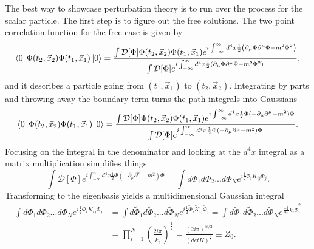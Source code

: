 The best way to showcase perturbation theory is to run over the process for the scalar particle. The first step is to figure out the free solutions. The two point correlation function for the free case is given by
\begin{equation}
\bra{0}\Phi(t_2,\vec{x}_2)\Phi(t_1,\vec{x}_1)\ket{0} = 
\frac{\int \mathcal{D}[\Phi]\Phi(t_2,\vec{x}_2)\Phi(t_1,\vec{x}_1)e^{i\int_{-\infty}^{\infty} d^4x \frac{1}{2}\left(\partial_\mu\Phi\partial^\mu\Phi - m^2 \Phi^2 \right)}}
{\int \mathcal{D}[\Phi]e^{i\int_{-\infty}^{\infty} d^4x \frac{1}{2}\left(\partial_\mu\Phi\partial^\mu\Phi - m^2 \Phi^2 \right)}},
\end{equation}
and it describes a particle going from $(t_1,\vec{x}_1)$ to $(t_2,\vec{x}_2)$. Integrating by parts and throwing away the boundary term turns the path integrals into Gaussians 
\begin{equation}
\bra{0}\Phi(t_2,\vec{x}_2)\Phi(t_1,\vec{x}_1)\ket{0} = 
\frac{\int \mathcal{D}[\Phi]\Phi(t_2,\vec{x}_2)\Phi(t_1,\vec{x}_1)e^{i\int_{-\infty}^{\infty} d^4x \frac{1}{2}\Phi (-\partial_\mu\partial^\mu - m^2)\Phi}}
{\int \mathcal{D}[\Phi]e^{i\int_{-\infty}^{\infty} d^4x \frac{1}{2}\Phi (-\partial_\mu\partial^\mu - m^2)\Phi}}.
\end{equation}
Focusing on the integral in the denominator and looking at the $d^4x$ integral as a matrix multiplication simplifies things 
\begin{equation}
\int \mathcal{D}[\Phi]e^{i\int_{-\infty}^{\infty} d^4x \frac{1}{2}\Phi (-\partial_\mu\partial^\mu - m^2)\Phi}
= \int d\Phi_1 d\Phi_2 ... d\Phi_N e^{i\frac{1}{2}\Phi_{i} K_{ij} \Phi_{j}}.
\end{equation}
Transforming to the eigenbasis yields a multidimensional Gaussian integral
\begin{equation}
\begin{split}
 \int d\Phi_1 d\Phi_2 ... d\Phi_N e^{i\frac{1}{2}\Phi_{i} K_{ij} \Phi_{j}} 
 &= \int d\tilde{\Phi}_1 d\tilde{\Phi}_2 ... d\tilde{\Phi}_N e^{i\frac{1}{2}\tilde{\Phi}_{i} \tilde{K}_{ij} \tilde{\Phi}_{j}} 
 = \int d\tilde{\Phi}_1 d\tilde{\Phi}_2 ... d\tilde{\Phi}_N e^{\frac{-1}{2i} \tilde{k}_i \tilde{\Phi}_{i}^2} \\ 
& = \prod_{i=1}^N \left( \frac{2i\pi}{\tilde{k}_i} \right)^\frac{1}{2} = \frac{\left( 2i\pi \right)^{N/2}}{ \left( detK \right)^\frac{1}{2}} \equiv Z_0.
\end{split}
\end{equation}

